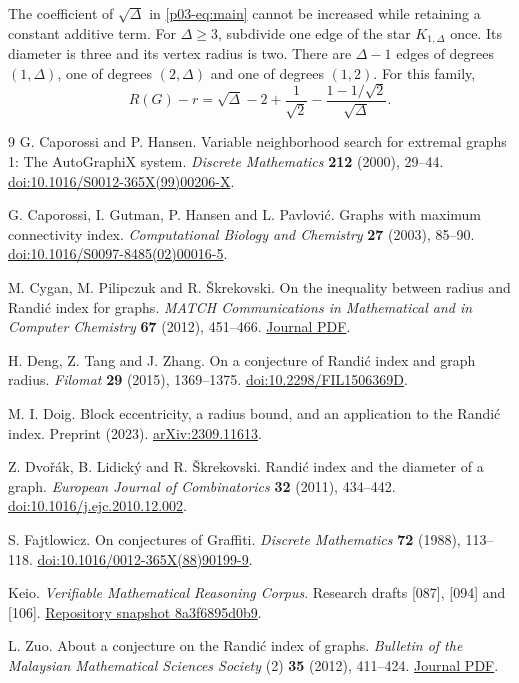 \documentclass[11pt,a4paper]{article}
\begin{document}
The coefficient of $\sqrt{\Delta}$ in \eqref{p03-eq:main} cannot be
increased while retaining a constant additive term. For $\Delta\ge3$,
subdivide one edge of the star $K_{1,\Delta}$ once. Its diameter is
three and its vertex radius is two. There are $\Delta-1$ edges of
degrees $(1,\Delta)$, one of degrees $(2,\Delta)$ and one of degrees
$(1,2)$. For this family,
\[
 R(G)-r=\sqrt{\Delta}-2+\frac1{\sqrt2}
            -\frac{1-1/\sqrt2}{\sqrt{\Delta}} .
\]

\begin{thebibliography}{9}
G. Caporossi and P. Hansen.
Variable neighborhood search for extremal graphs 1: The AutoGraphiX system.
\emph{Discrete Mathematics} \textbf{212} (2000), 29--44.
\href{https://doi.org/10.1016/S0012-365X(99)00206-X}{doi:10.1016/S0012-365X(99)00206-X}.

G. Caporossi, I. Gutman, P. Hansen and L. Pavlovi\'c.
Graphs with maximum connectivity index.
\emph{Computational Biology and Chemistry} \textbf{27} (2003), 85--90.
\href{https://doi.org/10.1016/S0097-8485(02)00016-5}{doi:10.1016/S0097-8485(02)00016-5}.

M. Cygan, M. Pilipczuk and R. \v{S}krekovski.
On the inequality between radius and Randi\'c index for graphs.
\emph{MATCH Communications in Mathematical and in Computer Chemistry}
\textbf{67} (2012), 451--466.
\href{https://match.pmf.kg.ac.rs/electronic_versions/Match67/n2/match67n2_451-466.pdf}{Journal PDF}.

H. Deng, Z. Tang and J. Zhang.
On a conjecture of Randi\'c index and graph radius.
\emph{Filomat} \textbf{29} (2015), 1369--1375.
\href{https://doi.org/10.2298/FIL1506369D}{doi:10.2298/FIL1506369D}.

M. I. Doig.
Block eccentricity, a radius bound, and an application to the Randi\'c index.
Preprint (2023). \href{https://arxiv.org/abs/2309.11613}{arXiv:2309.11613}.

Z. Dvo\v{r}\'ak, B. Lidick\'y and R. \v{S}krekovski.
Randi\'c index and the diameter of a graph.
\emph{European Journal of Combinatorics} \textbf{32} (2011), 434--442.
\href{https://doi.org/10.1016/j.ejc.2010.12.002}{doi:10.1016/j.ejc.2010.12.002}.

S. Fajtlowicz.
On conjectures of Graffiti.
\emph{Discrete Mathematics} \textbf{72} (1988), 113--118.
\href{https://doi.org/10.1016/0012-365X(88)90199-9}{doi:10.1016/0012-365X(88)90199-9}.

Keio.
\emph{Verifiable Mathematical Reasoning Corpus}.
Research drafts [087], [094] and [106].
\href{https://github.com/QEEDDD/Verifiable-Mathematical-Reasoning-Corpus/tree/8a3f6895d0b9b9f125e43157e4a003a2a2b51704}{Repository snapshot 8a3f6895d0b9}.

L. Zuo.
About a conjecture on the Randi\'c index of graphs.
\emph{Bulletin of the Malaysian Mathematical Sciences Society}
(2) \textbf{35} (2012), 411--424.
\href{https://math.usm.my/bulletin/pdf/v35n2/v35n2p16.pdf}{Journal PDF}.
\end{thebibliography}
\end{document}
